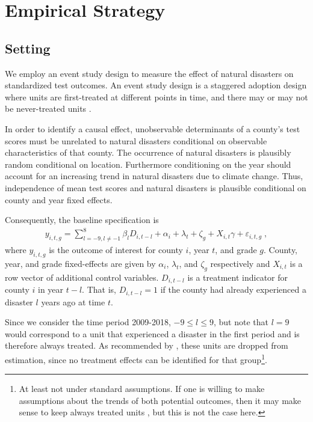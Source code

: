 
\section{Empirical Strategy}

\subsection{Setting}

We employ an event study design to measure the effect of natural disasters on standardized test outcomes. An event study design is a staggered adoption design where units are first-treated at different points in time, and there may or may not be never-treated units \citep{Sun_2021}.

In order to identify a causal effect, unobservable determinants of a county's test scores must be unrelated to natural disasters conditional on observable characteristics of that county. The occurrence of natural disasters is plausibly random conditional on location. Furthermore conditioning on the year should account for an increasing trend in natural disasters due to climate change. Thus, independence of mean test scores and natural disasters is plausible conditional on county and year fixed effects.

Consequently, the baseline specification is
\begin{align} \label{baseline}
	y_{i, t, g} = \sum_{l = -9, l \neq -1}^{8} \beta_l D_{i, t-l} + \alpha_i + \lambda_t + \zeta_g + X_{i, t} \gamma + \varepsilon_{i, t, g} \;,
\end{align}
where $y_{i, t, g}$ is the outcome of interest for county $i$, year $t$, and grade $g$. County, year, and grade fixed-effects are given by $\alpha_i$, $\lambda_t$, and $\zeta_g$ respectively and $X_{i, t}$ is a row vector of additional control variables. $D_{i, t-l}$ is a treatment indicator for county $i$ in year $t-l$. That is, $D_{i, t-l} = 1$ if the county had already experienced a disaster $l$ years ago at time $t$.

Since we consider the time period 2009-2018, $-9 \leq l \leq 9$, but note that $l = 9$ would correspond to a unit that experienced a disaster in the first period and is therefore always treated. As recommended by \cite{Sun_2021}, these units are dropped from estimation, since no treatment effects can be identified for that group\footnote{At least not under standard assumptions. If one is willing to make assumptions about the trends of both potential outcomes, then it may make sense to keep always treated units \citep[see][]{Marcus_2021}, but this is not the case here.}.

